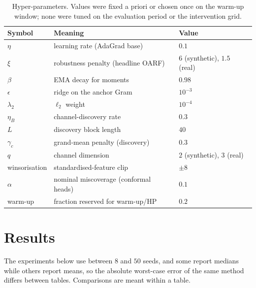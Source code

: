 \documentclass[authoryear,preprint,12pt]{elsarticle}
\theoremstyle{plain}
\theoremstyle{remark}
\newcommand{\OARF}{\textsc{OARF}}
\begin{document}
\begin{table}[htbp]
\centering
\caption{Hyper-parameters. Values were fixed a priori or chosen once on the warm-up
window; none were tuned on the evaluation period or the intervention grid.}
\label{tab:hyper}
\small
\begin{tabular}{lll}
\toprule
Symbol & Meaning & Value\\
\midrule
$\eta$ & learning rate (AdaGrad base) & $0.1$\\
$\xi$ & robustness penalty (headline \OARF{}) & $6$ (synthetic), $1.5$ (real)\\
$\beta$ & EMA decay for moments & $0.98$\\
$\epsilon$ & ridge on the anchor Gram & $10^{-3}$\\
$\lambda_2$ & $\ell_2$ weight & $10^{-4}$\\
$\eta_B$ & channel-discovery rate & $0.3$\\
$L$ & discovery block length & $40$\\
$\gamma_c$ & grand-mean penalty (discovery) & $0.3$\\
$q$ & channel dimension & $2$ (synthetic), $3$ (real)\\
winsorisation & standardised-feature clip & $\pm 8$\\
$\alpha$ & nominal miscoverage (conformal heads) & $0.1$\\
warm-up & fraction reserved for warm-up/HP & $0.2$\\
\bottomrule
\end{tabular}
\end{table}

\section{Results}\label{sec:results}

The experiments below use between $8$ and $50$ seeds, and some report medians while others report means, so the absolute worst-case error of the same method differs between tables. Comparisons are meant within a table.
\end{document}
